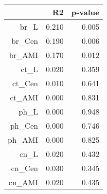 \begin{table}[ht]
\centering
\begin{tabular}{rrr}
  \hline
 & R2 & p-value \\ 
  \hline
  br\_L & 0.210 & 0.005 \\ 
  br\_Cen & 0.190 & 0.006 \\ 
  br\_AMI & 0.170 & 0.012 \\ 
  ct\_L & 0.020 & 0.359 \\ 
  ct\_Cen & 0.010 & 0.641 \\ 
  ct\_AMI & 0.000 & 0.831 \\ 
  ph\_L & 0.000 & 0.948 \\ 
  ph\_Cen & 0.000 & 0.746 \\ 
  ph\_AMI & 0.000 & 0.825 \\ 
  cn\_L & 0.020 & 0.432 \\ 
  cn\_Cen & 0.030 & 0.345 \\ 
  cn\_AMI & 0.020 & 0.435 \\ 
   \hline
\end{tabular}
\end{table}
